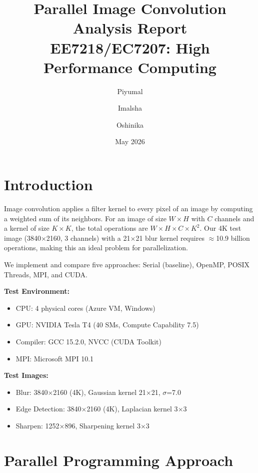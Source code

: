 \documentclass[12pt, a4paper]{article}
\title{\textbf{Parallel Image Convolution}\\[0.3cm]
\large Analysis Report\\[0.2cm]
\normalsize EE7218/EC7207: High Performance Computing}
\author{Piyumal \and Imalsha \and Oshinika}
\date{May 2026}
\begin{document}
\maketitle

\section{Introduction}

Image convolution applies a filter kernel to every pixel of an image by computing a weighted sum of its neighbors. For an image of size $W \times H$ with $C$ channels and a kernel of size $K \times K$, the total operations are $W \times H \times C \times K^2$. Our 4K test image (3840$\times$2160, 3 channels) with a 21$\times$21 blur kernel requires $\approx$10.9 billion operations, making this an ideal problem for parallelization.

We implement and compare five approaches: Serial (baseline), OpenMP, POSIX Threads, MPI, and CUDA.

\textbf{Test Environment:}
\begin{itemize}[nosep]
    \item CPU: 4 physical cores (Azure VM, Windows)
    \item GPU: NVIDIA Tesla T4 (40 SMs, Compute Capability 7.5)
    \item Compiler: GCC 15.2.0, NVCC (CUDA Toolkit)
    \item MPI: Microsoft MPI 10.1
\end{itemize}

\textbf{Test Images:}
\begin{itemize}[nosep]
    \item Blur: 3840$\times$2160 (4K), Gaussian kernel 21$\times$21, $\sigma$=7.0
    \item Edge Detection: 3840$\times$2160 (4K), Laplacian kernel 3$\times$3
    \item Sharpen: 1252$\times$896, Sharpening kernel 3$\times$3
\end{itemize}

\section{Parallel Programming Approach}
\end{document}
